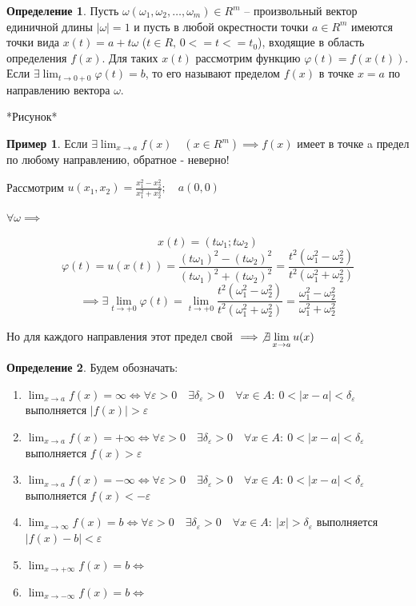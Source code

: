 \documentclass[a4paper,oneside]{article}
\newcommand{\dslim}{\displaystyle\lim}
\newcommand{\eps}{\varepsilon}
\theoremstyle{definition}
\newtheorem{definition}{Определение}[subsection]
\theoremstyle{definition}
\newtheorem*{example}{Пример}
\theoremstyle{definition}
\begin{document}
\begin{definition}
    Пусть $\omega(\omega_1, \omega_2, \dots, \omega_m) \in R^m$ -- произвольный вектор
    единичной длины $|\omega|=1$ и пусть в любой окрестности точки $a \in R^m$ имеются 
    точки вида $x(t) = a + t \omega$ ($t \in R,\, 0 <= t <= t_0$), входящие в область определения $f(x)$.
    Для таких $x(t)$ рассмотрим функцию $ \varphi(t) = f(x(t))$. Если $\exists \dslim_{t \to 0 + 0}  \varphi(t) = b$,
    то его называют пределом $f(x)$ в точке $x = a$ по направлению вектора $\omega$.
\end{definition}


*Рисунок*

\begin{example}
    Если $\exists \dslim_{x \to a} f(x) \quad (x \in R^m) \implies f(x)$ 
    имеет в точке a предел по любому направлению, обратное - неверно!

    Рассмотрим $u(x_1, x_2) = \frac{x_1^2-x_2^2}{x_1^2+x_2^2}; \quad a(0, 0)$

    $\forall\omega \implies$

    \[ x(t) = (t \omega_1; t \omega_2) \]
    \[ 
         \varphi(t) = u(x(t)) = 
        \frac{(t \omega_1)^2 - (t \omega_2)^2}{(t \omega_1)^2 + (t \omega_2)^2} = 
        \frac{t^2 (\omega_1^2 - \omega_2^2)}{t^2 (\omega_1^2 + \omega_2^2)}
    \]
    \[
        \implies \exists \dslim_{t \to +0}  \varphi(t) = 
        \dslim_{t \to +0} \frac{t^2 (\omega_1^2 - \omega_2^2)}{t^2 (\omega_1^2 + \omega_2^2)} = 
        \frac{\omega_1^2 - \omega_2^2}{\omega_1^2 + \omega_2^2}
    \]

    Но для каждого направления этот предел свой $\implies \not\exists \dslim_{x \to a} u(x)$  
\end{example}

\begin{definition}
    Будем обозначать: 
    \begin{enumerate}
        \item $\dslim_{x \to a} f(x) = \infty \iff \forall \eps > 0 \quad \exists \delta_\eps > 0 \quad \forall x \in A:\: 0 < |x-a| < \delta_\eps$ выполняется $|f(x)| > \eps$
        \item $\dslim_{x \to a} f(x) = +\infty \iff \forall \eps > 0 \quad \exists \delta_\eps > 0 \quad \forall x \in A:\: 0 < |x-a| < \delta_\eps$ выполняется $f(x) > \eps$
        \item $\dslim_{x \to a} f(x) = -\infty \iff \forall \eps > 0 \quad \exists \delta_\eps > 0 \quad \forall x \in A:\: 0 < |x-a| < \delta_\eps$ выполняется $f(x) < -\eps$
        \item $\dslim_{x \to \infty} f(x) = b \iff \forall \eps > 0 \quad \exists \delta_\eps > 0 \quad \forall x \in A:\: |x| > \delta_\eps$ выполняется $|f(x)-b| < \eps$
        \item $\dslim_{x \to +\infty} f(x) = b \iff $
        \item $\dslim_{x \to -\infty} f(x) = b \iff $
    \end{enumerate}
\end{definition}
\end{document}
